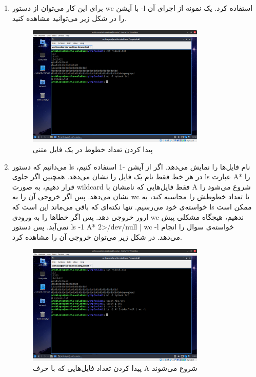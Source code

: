 \documentclass[12pt]{article}
\begin{document}
        \begin{enumerate}
        \item برای این کار می‌توان از دستور
        wc
        با آپشن
        \textenglish{-l}
        استفاده کرد. یک نمونه از اجرای آن را در شکل زیر می‌توانید مشاهده کنید.

        \begin{figure}[H]
		\centering
		\includegraphics[width=0.8\textwidth]{report1-resources/25.png}
		\caption{پیدا کردن تعداد خطوط در یک فایل متنی}
	\end{figure}

        \item 
        می‌دانیم که دستور
        ls
        نام فایل‌ها را نمایش می‌دهد. اگر از آپشن
        \textenglish{-1}
        استفاده کنیم، در هر خط فقط نام یک فایل را نشان می‌دهد. همچنین اگر جلوی 
        ls
        عبارت
        \textenglish{A*}
        را قرار دهیم، به صورت 
        wildcard
        فقط فایل‌هایی که نامشان با 
        A
        شروع می‌شود را نشان می‌دهد. 
        پس اگر خروجی آن را به 
        wc
        تا تعداد خطوطش را محاسبه کند، به خواسته‌ی خود می‌رسیم. تنها نکته‌ای که باقی می‌ماند این است که 
        ls
        ممکن است ارور خروجی دهد. پس اگر خطاها را به ورودی 
        wc
        ندهیم، هیچگاه مشکلی پیش نمی‌آید. پس دستور
        \textenglish{ls -1 A* 2>/dev/null | wc -l}
        خواسته‌ی سوال را انجام می‌دهد. در شکل زیر می‌توان خروجی آن را مشاهده کرد.

        \begin{figure}[H]
		\centering
		\includegraphics[width=0.8\textwidth]{report1-resources/26.png}
		\caption{پیدا کردن تعداد فایل‌هایی که با حرف A شروع می‌شوند}
	\end{figure}


\end{enumerate}
\end{document}
